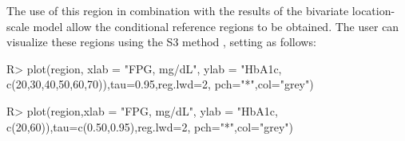 %
%
%
%
%

The use of this region in combination with the results of the bivariate location-scale model allow the conditional reference regions to be obtained. The user can visualize these regions using the  S3 method , setting  as follows:

\begin{example}
R> plot(region, xlab = "FPG, mg/dL", ylab = "HbA1c, %
   c(20,30,40,50,60,70)),tau=0.95,reg.lwd=2, pch="*",col="grey")

R> plot(region,xlab = "FPG, mg/dL", ylab = "HbA1c, %
   c(20,60)),tau=c(0.50,0.95),reg.lwd=2, pch="*",col="grey")	
\end{example}


